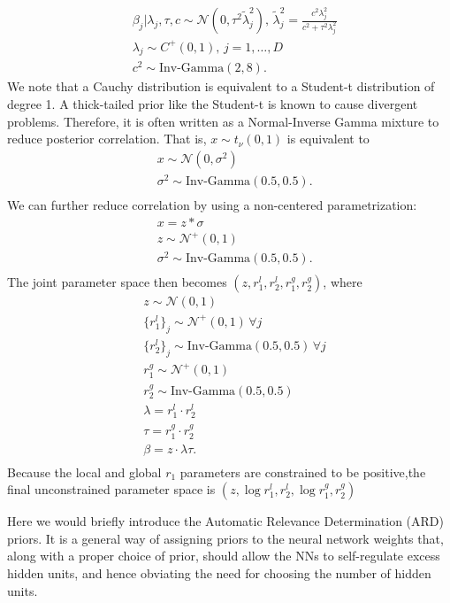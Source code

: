 \documentclass[12pt]{report}
\begin{document}
\begin{align*}
&\beta_j | \lambda_j, \tau, c \sim \mathcal{N}(0,\tau^2 \tilde{\lambda}_j^2) ,\, \tilde{\lambda}_j^2 = \frac{c^2 \lambda_j^2}{c^2 + \tau^2 \lambda_j^2} \\
&\lambda_j \sim C^+(0,1),\, j = 1,\dots,D\\
&c^2 \sim \text{Inv-Gamma}(2,8) .
\end{align*}
We note that a Cauchy distribution is equivalent to a Student-t distribution of degree 1. A thick-tailed prior like the Student-t is known to cause divergent problems. Therefore, it is often written as a Normal-Inverse Gamma mixture to reduce posterior correlation. That is, $x \sim t_{\nu}(0,1) $ is 
equivalent to 
\begin{align*}
& x \sim \mathcal{N}(0,\sigma^2)\\
&\sigma^2 \sim \text{Inv-Gamma}(0.5,0.5). \\
\end{align*}
We can further reduce correlation by using a non-centered parametrization:
\begin{align*}
& x = z * \sigma \\
& z \sim \mathcal{N}^+(0,1)\\
&\sigma^2 \sim \text{Inv-Gamma}(0.5,0.5). \\
\end{align*}
The joint parameter space then becomes $(z,r_1^l,r_2^l,r_1^g,r_2^g) $,
where
\begin{align*}
& z \sim \mathcal{N}(0,1) \\
& \{r_1^l\}_j \sim \mathcal{N}^+(0,1) \, \forall j \\
& \{r_2^l\}_j \sim \text{Inv-Gamma}(0.5,0.5) \, \forall j  \\
& r_1^g \sim \mathcal{N}^+(0,1)  \\
& r_2^g \sim \text{Inv-Gamma}(0.5,0.5)   \\
& \lambda =  r_1^l \cdot r_2^l \\
& \tau = r_1^g \cdot r_2^g \\
& \beta = z \cdot \lambda \tau . \\
\end{align*}
Because the local and global $r_1$ parameters are constrained to be positive,the final unconstrained parameter space is $(z,\log r_1^l,r_2^l,\log r_1^g,r_2^g)$


Here we would briefly introduce the Automatic Relevance Determination (ARD) priors. It is a general way of assigning priors to the neural network weights that, along with a proper choice of prior, should allow the NNs to self-regulate excess hidden units, and hence obviating the need for choosing the number of hidden units.
\end{document}
